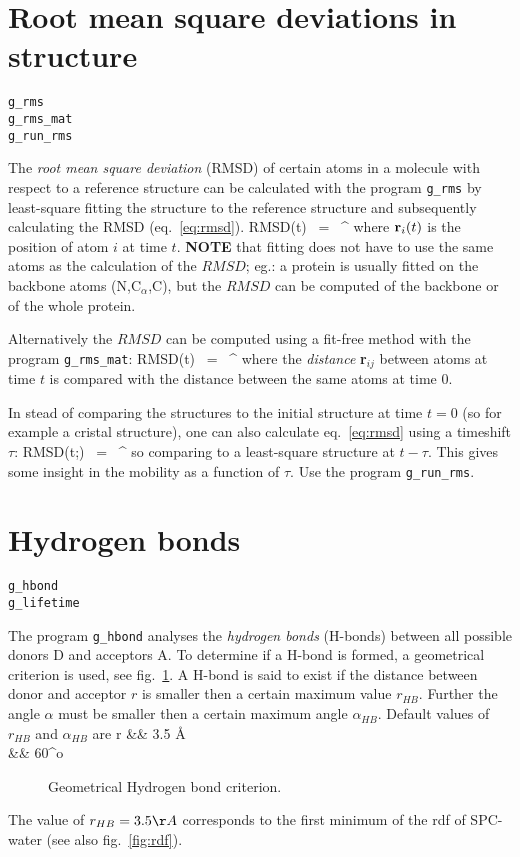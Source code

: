 \section{Root mean square deviations in structure}
\label{sec:rmsd}
\begin{verbatim}
g_rms
g_rms_mat
g_run_rms
\end{verbatim}
The {\em root mean square deviation} (RMSD) of certain atoms in a molecule
with respect to a reference structure can be calculated with the program 
{\tt g\_rms} by least-square fitting the structure to the reference structure
and subsequently calculating the RMSD (eq.~\ref{eq:rmsd}).
\beq
RMSD(t)	~=~ \left[\frac{1}{N} \sum_{i=1}^N ({\bf r}_i(t)-{\bf r}_i(0))^2 \right]^{}
\label{eq:rmsd}
\eeq
where ${\bf r}_i(t)$ is the position of atom $i$ at time $t$.
{\bf NOTE} that fitting does not have to use the same atoms as the calculation
of the $RMSD$; eg.: a protein is usually fitted on the backbone atoms
(N,C$_{\alpha}$,C), but the $RMSD$ can be computed of the backbone
or of the whole protein.

Alternatively the $RMSD$ can be computed using a fit-free method with the 
program {\tt g\_rms\_mat}:
\beq
RMSD(t)	~=~	\left[\frac{1}{N^2}\sum_{i=1}^N	\sum_{j=1}^N	({\bf r}_{ij}(t)-{\bf r}_{ij}(0))^2\right]^{}
\label{eq:rmsdff}
\eeq
where the {\em distance} {\bf r}$_{ij}$ between atoms at time $t$ 
is compared with the distance between the same atoms at time $0$.

In stead of comparing the structures to the initial structure at time $t=0$ 
(so for example a cristal structure), one can also calculate eq.~\ref{eq:rmsd} 
using a timeshift $\tau$:
\beq
RMSD(t;\tau) ~=~ \left[\frac{1}{N} \sum_{i=1}^N ({\bf r}_i(t)-{\bf r}_i(t-\tau))^2 \right]^{}
\label{eq:rmdstau}
\eeq
so comparing to a least-square structure at $t-\tau$. This gives some insight 
in the mobility as a function of $\tau$. Use the program {\tt g\_run\_rms}.
%
%
\section{Hydrogen bonds}
\begin{verbatim}
g_hbond
g_lifetime
\end{verbatim}
The program {\tt g\_hbond} analyses the {\em hydrogen bonds} (H-bonds) 
between all possible donors D and acceptors A. 
To determine if a H-bond is formed, a 
geometrical criterion is used, see fig.~\ref{fig:hbond}. A H-bond is said to 
exist if the distance between donor and acceptor $r$ is smaller then a certain 
maximum value $r_{HB}$. Further the angle $\alpha$ must be smaller then a 
certain maximum angle $\alpha_{HB}$. Default values of $r_{HB}$ and 
$\alpha_{HB}$ are
\bea
r &\leq& 3.5 \AA \nonumber\\
\alpha &\leq& 60^o \nonumber
\eea
%
\begin{figure}[hbtp]
\centerline{}
\caption{Geometrical Hydrogen bond criterion.}
\label{fig:hbond}
\end{figure}
%
The value of $r_{HB} = 3.5 \AA$ corresponds to the first minimum of the rdf of 
SPC-water (see also fig.~\ref{fig:rdf}).

